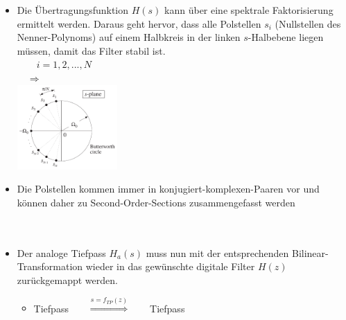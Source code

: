 \begin{itemize}
			 \item Die Übertragungsfunktion $H(s)$ kann über eine spektrale Faktorisierung ermittelt werden. Daraus geht hervor, dass alle Polstellen $s_i$ (Nullstellen des Nenner-Polynoms) auf einem Halbkreis in der linken $s$-Halbebene liegen müssen, damit das Filter stabil ist.\\[0.2cm]
			 $\qquad i=1,2,...,N$\\[0.2cm]
			 $\quad\Rightarrow\qquad$\\[-3cm]
			 \hspace*{11cm}\includegraphics[width = 0.3\textwidth]{pic/ButterworthKreis.pdf}\\[-0.7cm]
			 \item Die Polstellen kommen immer in konjugiert-komplexen-Paaren vor und können daher zu Second-Order-Sections zusammengefasst werden\\[0.2cm]
			 \\[0.2cm]\\[-0.1cm]
			 \item Der analoge Tiefpass $H_a(s)$ muss nun mit der entsprechenden Bilinear-Transformation wieder in das gewünschte digitale Filter $H(z)$ zurückgemappt werden.\\[0.1cm]
			 \begin{minipage}{0.45\textwidth}
				\begin{itemize}
				 \item Tiefpass$\qquad\overset{s=f_{TP}(z)}{\Longrightarrow}\qquad$Tiefpass\\[-0.3cm]

\end{itemize}
\end{minipage}
\end{itemize}
